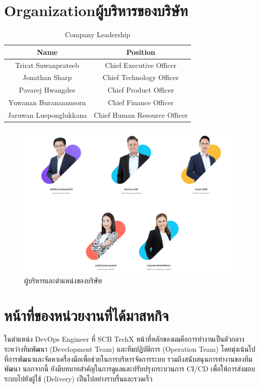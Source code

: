 \section{\ifenglish Organization\else ผู้บริหารของบริษัท\fi}
\begin{table}[ht]
    \centering
    \begin{tabular}{|c|c|}
        \hline
        \textbf{Name}          & \textbf{Position}            \\
        \hline
        Trirat Suwanprateeb    & Chief Executive Officer      \\
        Jonathan Sharp         & Chief Technology Officer     \\
        Pavarej Hwangdee       & Chief Product Officer        \\
        Yuwanan Buranaanusorn  & Chief Finance Officer        \\
        Jaruwan Lueponglukkana & Chief Human Resource Officer \\
        \hline
    \end{tabular}
    \caption{Company Leadership}
\end{table}
\begin{figure}[ht]
    \begin{center}
        \includegraphics[scale=0.3]{images/org.png}
    \end{center}
    \caption[ผู้บริหารและตำแหน่งของบริษัท]{ผู้บริหารและตำแหน่งของบริษัท}
\end{figure}

\clearpage

\section{หน้าที่ของหน่วยงานที่ได้มาสหกิจ}
ในตำแหน่ง DevOps Engineer ที่ SCB TechX หน้าที่หลักของผมคือการทำงานเป็นตัวกลางระหว่างทีมพัฒนา (Development Team) และทีมปฏิบัติการ (Operation Team) โดยมุ่งเน้นไปที่การพัฒนาและจัดหาเครื่องมือเพื่อช่วยในการบริหารจัดการระบบ รวมถึงสนับสนุนการทำงานของทีมพัฒนา นอกจากนี้ ยังมีบทบาทสำคัญในการดูแลและปรับปรุงกระบวนการ CI/CD เพื่อให้การส่งมอบระบบไปยังผู้ใช้ (Delivery) เป็นไปอย่างราบรื่นและรวดเร็ว

